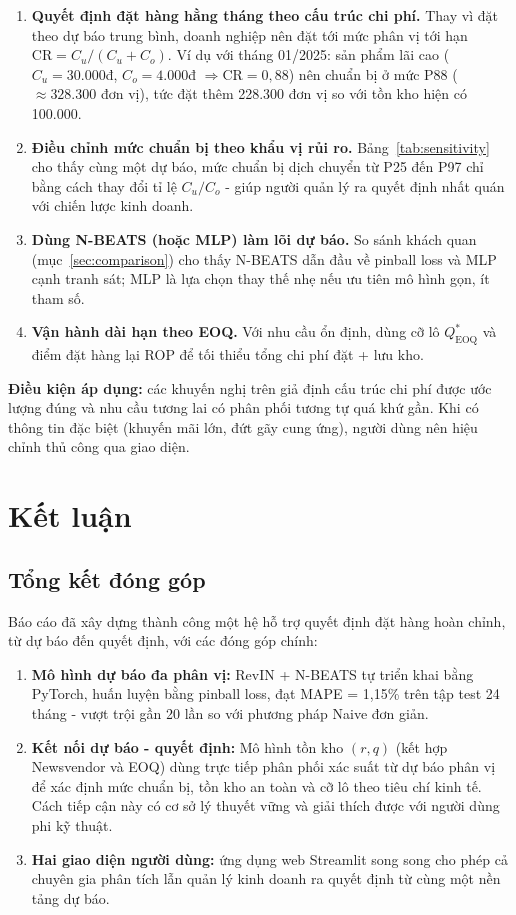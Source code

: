 \documentclass[12pt, a4paper]{report}
\newcommand{\CR}{\ensuremath{\mathrm{CR}}}
\newcommand{\Cu}{\ensuremath{C_u}}
\newcommand{\Co}{\ensuremath{C_o}}
\begin{document}
\begin{enumerate}
  \item \textbf{Quyết định đặt hàng hằng tháng theo cấu trúc chi phí.} Thay vì đặt theo dự báo trung bình, doanh nghiệp nên đặt tới mức phân vị tới hạn $\CR = \Cu/(\Cu+\Co)$. Ví dụ với tháng 01/2025: sản phẩm lãi cao ($\Cu = 30.000$đ, $\Co = 4.000$đ $\Rightarrow \CR = 0,88$) nên chuẩn bị ở mức P88 ($\approx 328.300$ đơn vị), tức đặt thêm 228.300 đơn vị so với tồn kho hiện có 100.000.
  \item \textbf{Điều chỉnh mức chuẩn bị theo khẩu vị rủi ro.} Bảng~\ref{tab:sensitivity} cho thấy cùng một dự báo, mức chuẩn bị dịch chuyển từ P25 đến P97 chỉ bằng cách thay đổi tỉ lệ $\Cu/\Co$ - giúp người quản lý ra quyết định nhất quán với chiến lược kinh doanh.
  \item \textbf{Dùng N-BEATS (hoặc MLP) làm lõi dự báo.} So sánh khách quan (mục~\ref{sec:comparison}) cho thấy N-BEATS dẫn đầu về pinball loss và MLP cạnh tranh sát; MLP là lựa chọn thay thế nhẹ nếu ưu tiên mô hình gọn, ít tham số.
  \item \textbf{Vận hành dài hạn theo EOQ.} Với nhu cầu ổn định, dùng cỡ lô $Q^*_{\text{EOQ}}$ và điểm đặt hàng lại ROP để tối thiểu tổng chi phí đặt + lưu kho.
\end{enumerate}

\textbf{Điều kiện áp dụng:} các khuyến nghị trên giả định cấu trúc chi phí được ước lượng đúng và nhu cầu tương lai có phân phối tương tự quá khứ gần. Khi có thông tin đặc biệt (khuyến mãi lớn, đứt gãy cung ứng), người dùng nên hiệu chỉnh thủ công qua giao diện.

\chapter{Kết luận}

\section{Tổng kết đóng góp}

Báo cáo đã xây dựng thành công một hệ hỗ trợ quyết định đặt hàng hoàn chỉnh, từ dự báo đến quyết định, với các đóng góp chính:

\begin{enumerate}
  \item \textbf{Mô hình dự báo đa phân vị:} RevIN + N-BEATS tự triển khai bằng PyTorch, huấn luyện bằng pinball loss, đạt MAPE = 1,15\% trên tập test 24 tháng - vượt trội gần 20 lần so với phương pháp Naive đơn giản.

  \item \textbf{Kết nối dự báo - quyết định:} Mô hình tồn kho $(r,q)$ (kết hợp Newsvendor và EOQ) dùng trực tiếp phân phối xác suất từ dự báo phân vị để xác định mức chuẩn bị, tồn kho an toàn và cỡ lô theo tiêu chí kinh tế. Cách tiếp cận này có cơ sở lý thuyết vững và giải thích được với người dùng phi kỹ thuật.

  \item \textbf{Hai giao diện người dùng:} ứng dụng web Streamlit song song cho phép cả chuyên gia phân tích lẫn quản lý kinh doanh ra quyết định từ cùng một nền tảng dự báo.
\end{enumerate}
\end{document}
